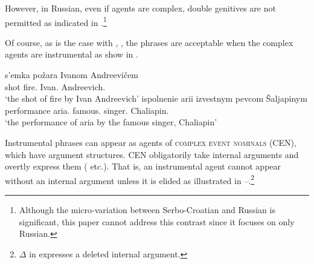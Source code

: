\documentclass[output=paper,
]{langscibook}
\begin{document}
\noindent
However, in Russian, even if agents are complex, double genitives are not permitted as indicated in .\footnote{
			Although the micro-variation between Serbo-Croatian  and Russian  is significant, this paper cannot address this contrast since it focuses on only Russian.}

\begin{exe}
\ex\label{dgr} %
\begin{xlist}
\end{xlist}
\end{exe}

\noindent
Of course, as is the case with , , the phrases are acceptable when the complex agents are instrumental as show in .

\begin{exe}
\ex\label{gicom} %
\begin{xlist}
\ex
\gll s'emka požara Ivanom Andreevičem\\
	shot fire.{\GEN}	Ivan.{\INS} Andreevich.{\INS}\\
\trans  `the shot of fire by Ivan Andreevich' 
\ex
\gll ispolnenie arii izvestnym	 pevcom Šaljapinym\\
	performance aria.{\GEN} famous.{\INS} singer.{\INS} Chaliapin.{\INS}\\
\trans `the performance of aria by the famous singer, Chaliapin' 
\end{xlist}
\end{exe}

\noindent Instrumental phrases can appear as agents of \textsc{complex event nominals} (CEN), which have argument structures.  
CEN obligatorily take internal arguments and overtly express them (\citealt{Revzin1973, Schoorlemmer1998} etc.). 
That is, an instrumental agent cannot appear without an internal argument unless it is elided as illustrated in --.\footnote{
			$\Delta$ in  expresses a deleted internal argument.			}
\end{document}
